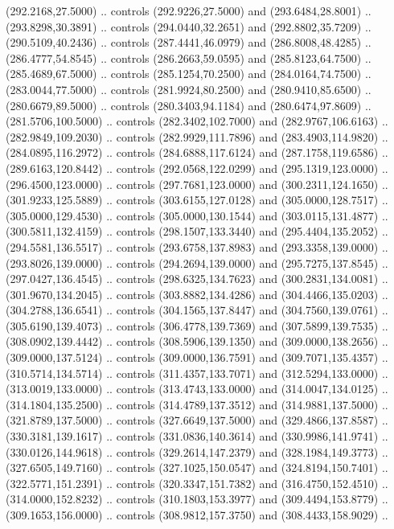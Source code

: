   (292.2168,27.5000) .. controls (292.9226,27.5000) and (293.6484,28.8001) ..
  (293.8298,30.3891) .. controls (294.0440,32.2651) and (292.8802,35.7209) ..
  (290.5109,40.2436) .. controls (287.4441,46.0979) and (286.8008,48.4285) ..
  (286.4777,54.8545) .. controls (286.2663,59.0595) and (285.8123,64.7500) ..
  (285.4689,67.5000) .. controls (285.1254,70.2500) and (284.0164,74.7500) ..
  (283.0044,77.5000) .. controls (281.9924,80.2500) and (280.9410,85.6500) ..
  (280.6679,89.5000) .. controls (280.3403,94.1184) and (280.6474,97.8609) ..
  (281.5706,100.5000) .. controls (282.3402,102.7000) and (282.9767,106.6163) ..
  (282.9849,109.2030) .. controls (282.9929,111.7896) and (283.4903,114.9820) ..
  (284.0895,116.2972) .. controls (284.6888,117.6124) and (287.1758,119.6586) ..
  (289.6163,120.8442) .. controls (292.0568,122.0299) and (295.1319,123.0000) ..
  (296.4500,123.0000) .. controls (297.7681,123.0000) and (300.2311,124.1650) ..
  (301.9233,125.5889) .. controls (303.6155,127.0128) and (305.0000,128.7517) ..
  (305.0000,129.4530) .. controls (305.0000,130.1544) and (303.0115,131.4877) ..
  (300.5811,132.4159) .. controls (298.1507,133.3440) and (295.4404,135.2052) ..
  (294.5581,136.5517) .. controls (293.6758,137.8983) and (293.3358,139.0000) ..
  (293.8026,139.0000) .. controls (294.2694,139.0000) and (295.7275,137.8545) ..
  (297.0427,136.4545) .. controls (298.6325,134.7623) and (300.2831,134.0081) ..
  (301.9670,134.2045) .. controls (303.8882,134.4286) and (304.4466,135.0203) ..
  (304.2788,136.6541) .. controls (304.1565,137.8447) and (304.7560,139.0761) ..
  (305.6190,139.4073) .. controls (306.4778,139.7369) and (307.5899,139.7535) ..
  (308.0902,139.4442) .. controls (308.5906,139.1350) and (309.0000,138.2656) ..
  (309.0000,137.5124) .. controls (309.0000,136.7591) and (309.7071,135.4357) ..
  (310.5714,134.5714) .. controls (311.4357,133.7071) and (312.5294,133.0000) ..
  (313.0019,133.0000) .. controls (313.4743,133.0000) and (314.0047,134.0125) ..
  (314.1804,135.2500) .. controls (314.4789,137.3512) and (314.9881,137.5000) ..
  (321.8789,137.5000) .. controls (327.6649,137.5000) and (329.4866,137.8587) ..
  (330.3181,139.1617) .. controls (331.0836,140.3614) and (330.9986,141.9741) ..
  (330.0126,144.9618) .. controls (329.2614,147.2379) and (328.1984,149.3773) ..
  (327.6505,149.7160) .. controls (327.1025,150.0547) and (324.8194,150.7401) ..
  (322.5771,151.2391) .. controls (320.3347,151.7382) and (316.4750,152.4510) ..
  (314.0000,152.8232) .. controls (310.1803,153.3977) and (309.4494,153.8779) ..
  (309.1653,156.0000) .. controls (308.9812,157.3750) and (308.4433,158.9029) ..
